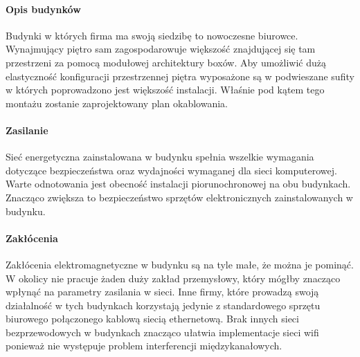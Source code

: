 \documentclass{report}
\begin{document}
\paragraph{Opis budynków}Budynki w których firma ma swoją siedzibę to nowoczesne biurowce. Wynajmujący piętro sam zagospodarowuje większość 
znajdującej się tam przestrzeni za pomocą modułowej architektury boxów. Aby umożliwić dużą elastyczność konfiguracji przestrzennej piętra 
wyposażone są w podwieszane sufity w których poprowadzono jest większość instalacji. Właśnie pod kątem tego montażu zostanie zaprojektowany plan
okablowania.

\paragraph{Zasilanie}Sieć energetyczna zainstalowana w budynku spełnia wszelkie wymagania dotyczące bezpieczeństwa oraz wydajności wymaganej dla sieci komputerowej.
Warte odnotowania jest obecność instalacji piorunochronowej na obu budynkach. Znacząco zwiększa to bezpieczeństwo sprzętów elektronicznych zainstalowanych
w budynku.

\paragraph{Zakłócenia}Zakłócenia elektromagnetyczne w budynku są na tyle małe, że można je pominąć. W okolicy nie pracuje żaden duży zakład przemysłowy, który mógłby 
znacząco wpłynąć na parametry zasilania w sieci. Inne firmy, które prowadzą swoją działalność w tych budynkach korzystają jedynie z standardowego
sprzętu biurowego połączonego kablową siecią ethernetową. Brak innych sieci bezprzewodowych w budynkach znacząco ułatwia implementacje sieci wifi
ponieważ nie występuje problem interferencji międzykanałowych.


\pagebreak[4]
\end{document}
